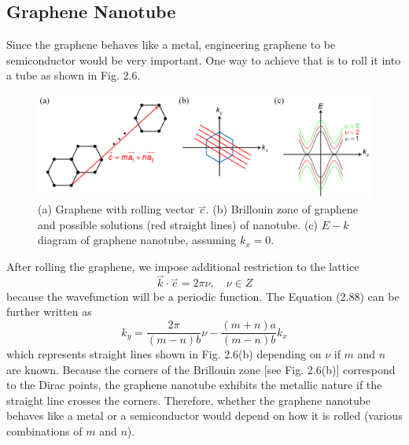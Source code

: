 \subsection{Graphene Nanotube}
Since the graphene behaves like a metal, engineering graphene to be semiconductor would be very important. One way to achieve that is to roll it into a tube as shown in Fig. 2.6.
\begin{figure}[tbp]
\includegraphics[width=\textwidth]{figures/Fig2_6}
\centering
\caption{\small (a) Graphene with rolling vector $\overset{\rightharpoonup}{c}$. (b) Brillouin zone of graphene and possible solutions (red straight lines) of nanotube. (c) $E-k$ diagram of graphene nanotube, assuming $k_{x}=0$.}
\end{figure} After rolling the graphene, we impose additional restriction to the lattice \begin{equation}
    \overset{\rightharpoonup}{k}\cdot\overset{\rightharpoonup}{c} = 2\pi\nu,\quad \nu\in Z
\end{equation} because the wavefunction will be a periodic function. The Equation (2.88) can be further written as \begin{equation}
    k_{y} = \frac{2\pi}{\left(m-n\right)b}\nu-\frac{\left(m+n\right)a}{\left(m-n\right)b}k_{x}
\end{equation} which represents straight lines shown in Fig. 2.6(b) depending on $\nu$ if $m$ and $n$ are known. Because the corners of the Brillouin zone [see Fig. 2.6(b)] correspond to the Dirac points, the graphene nanotube exhibits the metallic nature if the straight line crosses the corners. Therefore, whether the graphene nanotube behaves like a metal or a semiconductor would depend on how it is rolled (various combinations of $m$ and $n$).
